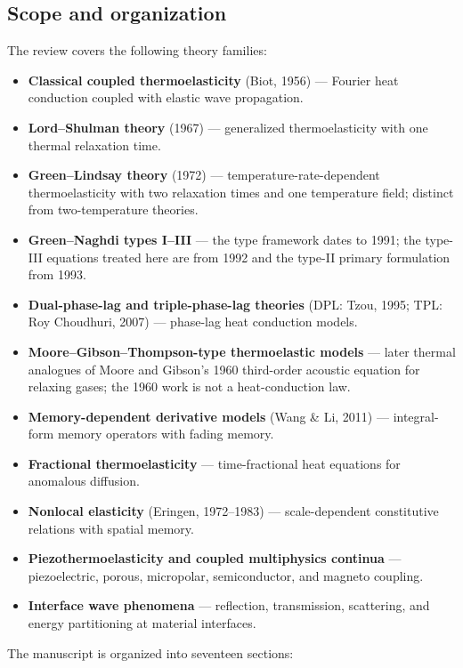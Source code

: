 \subsection{Scope and organization}

The review covers the following theory families:

\begin{itemize}
\item \textbf{Classical coupled thermoelasticity} (Biot, 1956) — Fourier heat conduction coupled with elastic wave propagation.
\item \textbf{Lord--Shulman theory} (1967) — generalized thermoelasticity with one thermal relaxation time.
\item \textbf{Green--Lindsay theory} (1972) — temperature-rate-dependent thermoelasticity with two relaxation times and one temperature field; distinct from two-temperature theories.
\item \textbf{Green--Naghdi types I--III} — the type framework dates to 1991; the type-III equations treated here are from 1992 and the type-II primary formulation from 1993.
\item \textbf{Dual-phase-lag and triple-phase-lag theories} (DPL: Tzou, 1995; TPL: Roy Choudhuri, 2007) — phase-lag heat conduction models.
\item \textbf{Moore--Gibson--Thompson-type thermoelastic models} — later thermal analogues of Moore and Gibson's 1960 third-order acoustic equation for relaxing gases; the 1960 work is not a heat-conduction law.
\item \textbf{Memory-dependent derivative models} (Wang \& Li, 2011) — integral-form memory operators with fading memory.
\item \textbf{Fractional thermoelasticity} — time-fractional heat equations for anomalous diffusion.
\item \textbf{Nonlocal elasticity} (Eringen, 1972--1983) — scale-dependent constitutive relations with spatial memory.
\item \textbf{Piezothermoelasticity and coupled multiphysics continua} — piezoelectric, porous, micropolar, semiconductor, and magneto coupling.
\item \textbf{Interface wave phenomena} — reflection, transmission, scattering, and energy partitioning at material interfaces.
\end{itemize}

The manuscript is organized into seventeen sections:

